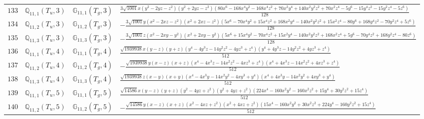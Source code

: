 \documentclass[fleqn,8pt,landscape]{jsarticle}
\begin{document}
\begin{table}[ht!]
\begin{center}
\begin{tabular}{cccl}
$ 133 $ & $ \mathbb{Q}_{11,1}(T_{u},3) $ & $ \mathbb{G}_{11,1}(T_{g},3) $ & $ \frac{3 \sqrt{1001} x \left(y^{2} - 2 y z - z^{2}\right) \left(y^{2} + 2 y z - z^{2}\right) \left(80 x^{6} - 168 x^{4} y^{2} - 168 x^{4} z^{2} + 70 x^{2} y^{4} + 140 x^{2} y^{2} z^{2} + 70 x^{2} z^{4} - 5 y^{6} - 15 y^{4} z^{2} - 15 y^{2} z^{4} - 5 z^{6}\right)}{128} $ \\
$ 134 $ & $ \mathbb{Q}_{11,2}(T_{u},3) $ & $ \mathbb{G}_{11,2}(T_{g},3) $ & $ - \frac{3 \sqrt{1001} y \left(x^{2} - 2 x z - z^{2}\right) \left(x^{2} + 2 x z - z^{2}\right) \left(5 x^{6} - 70 x^{4} y^{2} + 15 x^{4} z^{2} + 168 x^{2} y^{4} - 140 x^{2} y^{2} z^{2} + 15 x^{2} z^{4} - 80 y^{6} + 168 y^{4} z^{2} - 70 y^{2} z^{4} + 5 z^{6}\right)}{128} $ \\
$ 135 $ & $ \mathbb{Q}_{11,3}(T_{u},3) $ & $ \mathbb{G}_{11,3}(T_{g},3) $ & $ - \frac{3 \sqrt{1001} z \left(x^{2} - 2 x y - y^{2}\right) \left(x^{2} + 2 x y - y^{2}\right) \left(5 x^{6} + 15 x^{4} y^{2} - 70 x^{4} z^{2} + 15 x^{2} y^{4} - 140 x^{2} y^{2} z^{2} + 168 x^{2} z^{4} + 5 y^{6} - 70 y^{4} z^{2} + 168 y^{2} z^{4} - 80 z^{6}\right)}{128} $ \\
$ 136 $ & $ \mathbb{Q}_{11,1}(T_{u},4) $ & $ \mathbb{G}_{11,1}(T_{g},4) $ & $ \frac{\sqrt{1939938} x \left(y - z\right) \left(y + z\right) \left(y^{4} - 4 y^{3} z - 14 y^{2} z^{2} - 4 y z^{3} + z^{4}\right) \left(y^{4} + 4 y^{3} z - 14 y^{2} z^{2} + 4 y z^{3} + z^{4}\right)}{512} $ \\
$ 137 $ & $ \mathbb{Q}_{11,2}(T_{u},4) $ & $ \mathbb{G}_{11,2}(T_{g},4) $ & $ - \frac{\sqrt{1939938} y \left(x - z\right) \left(x + z\right) \left(x^{4} - 4 x^{3} z - 14 x^{2} z^{2} - 4 x z^{3} + z^{4}\right) \left(x^{4} + 4 x^{3} z - 14 x^{2} z^{2} + 4 x z^{3} + z^{4}\right)}{512} $ \\
$ 138 $ & $ \mathbb{Q}_{11,3}(T_{u},4) $ & $ \mathbb{G}_{11,3}(T_{g},4) $ & $ \frac{\sqrt{1939938} z \left(x - y\right) \left(x + y\right) \left(x^{4} - 4 x^{3} y - 14 x^{2} y^{2} - 4 x y^{3} + y^{4}\right) \left(x^{4} + 4 x^{3} y - 14 x^{2} y^{2} + 4 x y^{3} + y^{4}\right)}{512} $ \\
$ 139 $ & $ \mathbb{Q}_{11,1}(T_{u},5) $ & $ \mathbb{G}_{11,1}(T_{g},5) $ & $ \frac{\sqrt{14586} x \left(y - z\right) \left(y + z\right) \left(y^{2} - 4 y z + z^{2}\right) \left(y^{2} + 4 y z + z^{2}\right) \left(224 x^{4} - 160 x^{2} y^{2} - 160 x^{2} z^{2} + 15 y^{4} + 30 y^{2} z^{2} + 15 z^{4}\right)}{512} $ \\
$ 140 $ & $ \mathbb{Q}_{11,2}(T_{u},5) $ & $ \mathbb{G}_{11,2}(T_{g},5) $ & $ - \frac{\sqrt{14586} y \left(x - z\right) \left(x + z\right) \left(x^{2} - 4 x z + z^{2}\right) \left(x^{2} + 4 x z + z^{2}\right) \left(15 x^{4} - 160 x^{2} y^{2} + 30 x^{2} z^{2} + 224 y^{4} - 160 y^{2} z^{2} + 15 z^{4}\right)}{512} $ \\

\end{tabular}
\end{center}
\end{table}
\end{document}
